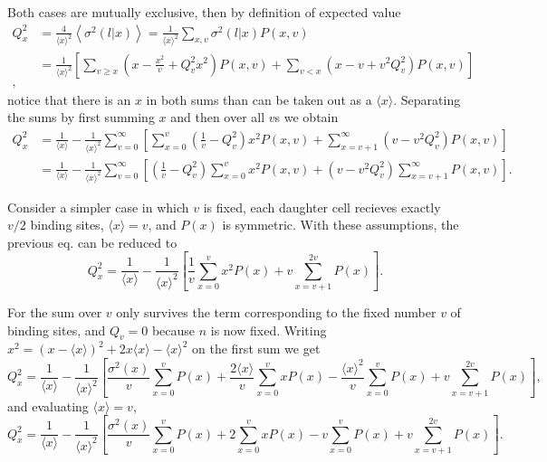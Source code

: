 Both cases are mutually exclusive, then by definition of expected value
\begin{equation*}
  \begin{split}
    Q_x^2 &= \frac{4}{\langle x\rangle^2}\left\langle\sigma^2(l|x)\right\rangle = \frac{1}{\langle x\rangle^2}\sum_{x,v}\sigma^2(l|x)P(x,v)\\
    &=\frac{1}{\langle x\rangle^2}\left[\sum_{v\geq x}\left(x-\frac{x^2}{v}+Q_v^2x^2\right)P(x,v) + \sum_{v<x}\left(x-v+v^2Q_v^2\right)P(x,v)\right]\\,
  \end{split}
\end{equation*}
notice that there is an $x$ in both sums than can be taken out as a $\langle x\rangle$. Separating the sums by first summing $x$ and then over all $v$s we obtain
\begin{equation*}
  \begin{split}
     Q_x^2 &= \frac{1}{\langle x\rangle} - \frac{1}{\langle x\rangle^2}\sum_{v=0}^\infty\left[\sum_{x=0}^v\left(\frac{1}{v}-Q_v^2\right)x^2P(x,v)+\sum_{x=v+1}^\infty\left(v-v^2Q_v^2\right)P(x,v)\right]\\
     &=\frac{1}{\langle x\rangle} - \frac{1}{\langle x\rangle^2}\sum_{v=0}^\infty\left[\left(\frac{1}{v}-Q_v^2\right)\sum_{x=0}^vx^2P(x,v)+\left(v-v^2Q_v^2\right)\sum_{x=v+1}^\infty P(x,v)\right].
  \end{split}
\end{equation*}

Consider a simpler case in which $v$ is fixed, each daughter cell recieves exactly $v/2$ binding sites, $\langle x\rangle = v$, and $P(x)$ is symmetric. With these assumptions, the previous eq. can be reduced to
\begin{equation*}
  Q_x^2 = \frac{1}{\langle x\rangle} - \frac{1}{\langle x\rangle^2}\left[\frac{1}{v}\sum_{x=0}^vx^2P(x)+v\sum_{x=v+1}^{2v}P(x)\right].
\end{equation*}

For the sum over $v$ only survives the term corresponding to the fixed number $v$ of binding sites, and $Q_v=0$ because $n$ is now fixed. Writing $x^2 = \left(x-\langle x\rangle\right)^2 + 2x\langle x\rangle - \langle x\rangle^2$ on the first sum we get 
\begin{equation*}
  Q_x^2 = \frac{1}{\langle x\rangle}-\frac{1}{\langle x\rangle^2}\left[\frac{\sigma^2(x)}{v}\sum_{x=0}^vP(x)+\frac{2\langle x\rangle}{v}\sum_{x=0}^vxP(x)-\frac{\langle x\rangle^2}{v}\sum_{x=0}^vP(x)+v\sum_{x=v+1}^{2v}P(x)\right],
\end{equation*}
and evaluating $\langle x\rangle = v$,
\begin{equation*}
  Q_x^2 = \frac{1}{\langle x\rangle}-\frac{1}{\langle x\rangle^2}\left[\frac{\sigma^2(x)}{v}\sum_{x=0}^vP(x)+2\sum_{x=0}^vxP(x)-v\sum_{x=0}^vP(x)+v\sum_{x=v+1}^{2v}P(x)\right].
\end{equation*}

